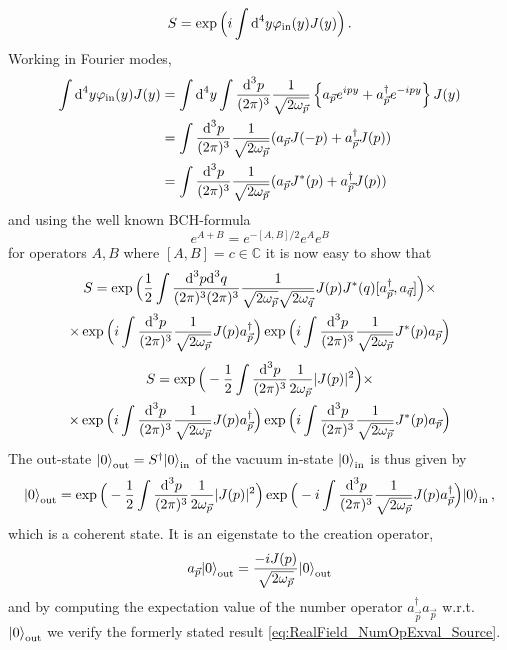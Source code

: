 \begin{equation}
    S=\exp\Big({i}\int\text{d}^4y\varphi_{\text{in}}(y)J(y)\Big)\,.
\end{equation}
Working in Fourier modes,
\begin{align}
    \int\text{d}^4y\varphi_{\text{in}}(y)J(y)&=\int\text{d}^4y\int\frac{\text{d} ^3p}{(2\pi)^3}\frac{1}{\sqrt{2\omega_{\vec{p}}}}\left\{a_{\vec{p}}e^{{i} py}+a_{\vec{p}}^\dagger e^{-{i} py}\right\}J(y)\\
    &=\int\frac{\text{d} ^3p}{(2\pi)^3}\frac{1}{\sqrt{2\omega_{\vec{p}}}}(a_{\vec{p}}J(-p)+a_{\vec{p}}^\dagger J(p))\\
    &=\int\frac{\text{d} ^3p}{(2\pi)^3}\frac{1}{\sqrt{2\omega_{\vec{p}}}}(a_{\vec{p}}J^*(p)+a_{\vec{p}}^\dagger J(p))
\end{align}
and using the well known BCH-formula
\begin{equation}
    e^{A+B}=e^{-[A,B]/2}e^Ae^B
\end{equation}
for operators ${A,B}$ where ${[A,B]=c\in\mathbb{C}}$ it is now easy to show that
\begin{multline}
    S=\exp\Big(\frac{1}{2}\int\frac{\text{d}^3p\text{d}^3q}{(2\pi)^3(2\pi)^3}\frac{1}{\sqrt{2\omega_{\vec{p}}}\sqrt{2\omega_{\vec{q}}}}J(p)J^*(q)[a_{\vec{p}}^\dagger,a_{\vec{q}}]\Big)\times\\
    \times\exp\Big({i}\int\frac{\text{d} ^3p}{(2\pi)^3}\frac{1}{\sqrt{2\omega_{\vec{p}}}}J(p)a_{\vec{p}}^\dagger\Big)\exp\Big({i}\int\frac{\text{d} ^3p}{(2\pi)^3}\frac{1}{\sqrt{2\omega_{\vec{p}}}}J^*(p)a_{\vec{p}}\Big)
\end{multline}
\begin{multline}
    S=\exp\Big(-\frac{1}{2}\int\frac{\text{d}^3p}{(2\pi)^3}\frac{1}{2\omega_{\vec{p}}}\vert J(p)\vert^2\Big)\times\\
    \times\exp\Big({i}\int\frac{\text{d} ^3p}{(2\pi)^3}\frac{1}{\sqrt{2\omega_{\vec{p}}}}J(p)a_{\vec{p}}^\dagger\Big)\exp\Big({i}\int\frac{\text{d} ^3p}{(2\pi)^3}\frac{1}{\sqrt{2\omega_{\vec{p}}}}J^*(p)a_{\vec{p}}\Big)
\end{multline}
The out-state ${{\lvert0\rangle}_{\text{out}}=S^\dagger{\lvert0\rangle}_{\text{in}}}$ of the vacuum in-state ${\lvert0\rangle}_{\text{in}}$ is thus given by
\begin{equation}
    {\lvert0\rangle}_{\text{out}}=\exp\Big(-\frac{1}{2}\int\frac{\text{d}^3p}{(2\pi)^3}\frac{1}{2\omega_{\vec{p}}}\vert J(p)\vert^2\Big)\exp\Big(-{i}\int\frac{\text{d} ^3p}{(2\pi)^3}\frac{1}{\sqrt{2\omega_{\vec{p}}}}J(p)a_{\vec{p}}^\dagger\Big){\lvert0\rangle}_{\text{in}}\,,
\end{equation}
which is a coherent state. It is an eigenstate to the creation operator,
\begin{equation}
    a_{\vec{p}}{\lvert0\rangle}_{\text{out}}=\frac{-{i} J(p)}{\sqrt{2\omega_{\vec{p}}}}{\lvert0\rangle}_{\text{out}}
\end{equation}
and by computing the expectation value of the number operator ${a^\dagger_{\vec{p}}a_{\vec{p}}}$ w.r.t. ${\lvert0\rangle}_{\text{out}}$ we verify the formerly stated result \eqref{eq:RealField_NumOpExval_Source}.